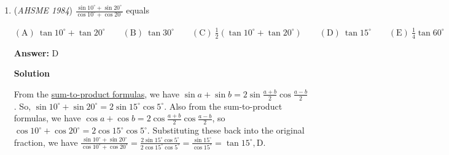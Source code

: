 \begin{enumerate}
 $\mathrm{(A) \ } \text{a straight line} \qquad \mathrm{(B) \ } \text{a parabola} \qquad \mathrm{(C) \ } \text{part, but not all, of a parabola} \qquad \mathrm{(D) \ } \text{one branch of a hyperbola} \qquad \mathrm{(E) \ } \text{none of these}$

 \textbf{Answer: }B



\textbf{Solution}

The $x$-coordinate of the vertex of the parabola $ax^2 + tx + c$ is $-\frac{t}{2a}$, so $x_t=-\frac{t}{2a}$. Substituting yields $y_t=-\frac{t^2}{4a^2}+c$. Notice that $y_t=-\frac{t^2}{4a^2}+c=-a(-\frac{t}{2a})^2+c=-ax_t^2+c$, so all of the vertices are on a parabola. However, we have only showed that all of the points in the locus of vertices are on a parabola, we have not shown whether or not all points on the parabola are on the locus. Assume we are given an $x_t$ on the parabola. $-\frac{t}{2a}=x_t$, $t = -2ax_t$, so a unique $t$, and therefore a unique vertex, is determined for each point on the parabola. We therefore conclude that every point in the locus is on the parabola and every point on the parabola is in the locus, and the graph of the locus is the same as the graph of the parabola, $\boxed{\text{B}}$.

 


	\item (\textit{AHSME 1984}) $\frac{\sin{10^\circ}+\sin{20^\circ}}{\cos{10^\circ}+\cos{20^\circ}}$ equals


 $\mathrm{(A) \ }\tan{10^\circ}+\tan{20^\circ} \qquad \mathrm{(B) \ }\tan{30^\circ} \qquad \mathrm{(C) \ } \frac{1}{2}(\tan{10^\circ}+\tan{20^\circ}) \qquad \mathrm{(D) \ }\tan{15^\circ} \qquad \mathrm{(E) \ } \frac{1}{4}\tan{60^\circ}$

 \textbf{Answer: }D



\textbf{Solution}

From the \href{https://artofproblemsolving.com/wiki/index.php?title=Trigonometric\_identities\#Prosthaphaeresis\_Identities}{sum-to-product formulas}, we have $\sin{a}+\sin{b}=2\sin{\frac{a+b}{2}}\cos{\frac{a-b}{2}}$. So, $\sin{10^\circ}+\sin{20^\circ}=2\sin{15^\circ}\cos{5^\circ}$. Also from the sum-to-product formulas, we have $\cos{a}+\cos{b}=2\cos{\frac{a+b}{2}}\cos{\frac{a-b}{2}}$, so $\cos{10^\circ}+\cos{20^\circ}=2\cos{15^\circ}\cos{5^\circ}$. Substituting these back into the original fraction, we have $\frac{\sin{10^\circ}+\sin{20^\circ}}{\cos{10^\circ}+\cos{20^\circ}}=\frac{2\sin{15^\circ}\cos{5^\circ}}{2\cos{15^\circ}\cos{5^\circ}}=\frac{\sin{15^\circ}}{\cos{15^\circ}}=\tan{15^\circ}, \boxed{\text{D}}$.


\end{enumerate}
